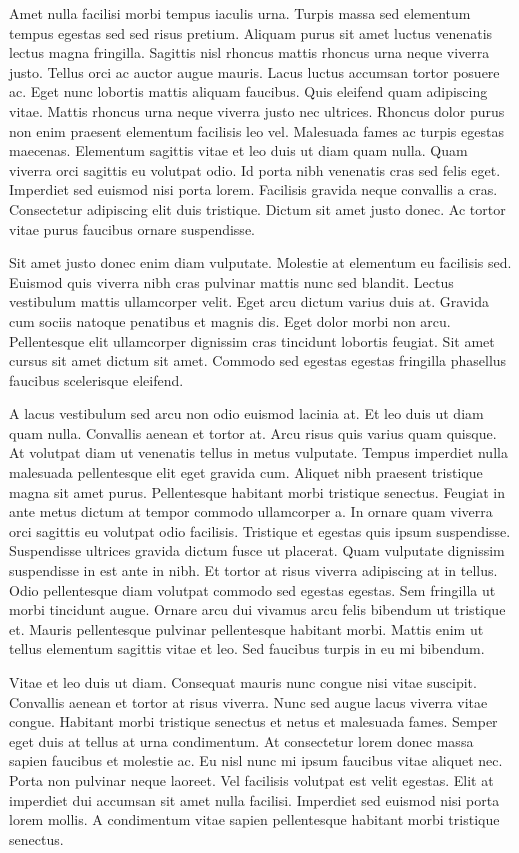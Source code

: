 \documentclass[epsf,a4paper]{book}
\begin{document}
Amet nulla facilisi morbi tempus iaculis urna. Turpis massa sed elementum tempus egestas sed sed risus pretium. Aliquam purus sit amet luctus venenatis lectus magna fringilla. Sagittis nisl rhoncus mattis rhoncus urna neque viverra justo. Tellus orci ac auctor augue mauris. Lacus luctus accumsan tortor posuere ac. Eget nunc lobortis mattis aliquam faucibus. Quis eleifend quam adipiscing vitae. Mattis rhoncus urna neque viverra justo nec ultrices. Rhoncus dolor purus non enim praesent elementum facilisis leo vel. Malesuada fames ac turpis egestas maecenas. Elementum sagittis vitae et leo duis ut diam quam nulla. Quam viverra orci sagittis eu volutpat odio. Id porta nibh venenatis cras sed felis eget. Imperdiet sed euismod nisi porta lorem. Facilisis gravida neque convallis a cras. Consectetur adipiscing elit duis tristique. Dictum sit amet justo donec. Ac tortor vitae purus faucibus ornare suspendisse.

Sit amet justo donec enim diam vulputate. Molestie at elementum eu facilisis sed. Euismod quis viverra nibh cras pulvinar mattis nunc sed blandit. Lectus vestibulum mattis ullamcorper velit. Eget arcu dictum varius duis at. Gravida cum sociis natoque penatibus et magnis dis. Eget dolor morbi non arcu. Pellentesque elit ullamcorper dignissim cras tincidunt lobortis feugiat. Sit amet cursus sit amet dictum sit amet. Commodo sed egestas egestas fringilla phasellus faucibus scelerisque eleifend.

A lacus vestibulum sed arcu non odio euismod lacinia at. Et leo duis ut diam quam nulla. Convallis aenean et tortor at. Arcu risus quis varius quam quisque. At volutpat diam ut venenatis tellus in metus vulputate. Tempus imperdiet nulla malesuada pellentesque elit eget gravida cum. Aliquet nibh praesent tristique magna sit amet purus. Pellentesque habitant morbi tristique senectus. Feugiat in ante metus dictum at tempor commodo ullamcorper a. In ornare quam viverra orci sagittis eu volutpat odio facilisis. Tristique et egestas quis ipsum suspendisse. Suspendisse ultrices gravida dictum fusce ut placerat. Quam vulputate dignissim suspendisse in est ante in nibh. Et tortor at risus viverra adipiscing at in tellus. Odio pellentesque diam volutpat commodo sed egestas egestas. Sem fringilla ut morbi tincidunt augue. Ornare arcu dui vivamus arcu felis bibendum ut tristique et. Mauris pellentesque pulvinar pellentesque habitant morbi. Mattis enim ut tellus elementum sagittis vitae et leo. Sed faucibus turpis in eu mi bibendum.

Vitae et leo duis ut diam. Consequat mauris nunc congue nisi vitae suscipit. Convallis aenean et tortor at risus viverra. Nunc sed augue lacus viverra vitae congue. Habitant morbi tristique senectus et netus et malesuada fames. Semper eget duis at tellus at urna condimentum. At consectetur lorem donec massa sapien faucibus et molestie ac. Eu nisl nunc mi ipsum faucibus vitae aliquet nec. Porta non pulvinar neque laoreet. Vel facilisis volutpat est velit egestas. Elit at imperdiet dui accumsan sit amet nulla facilisi. Imperdiet sed euismod nisi porta lorem mollis. A condimentum vitae sapien pellentesque habitant morbi tristique senectus.
\end{document}
